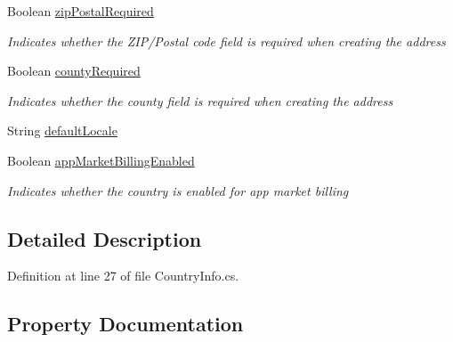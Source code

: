 \begin{DoxyCompactItemize}
Boolean \hyperlink{classcom_1_1clover_1_1sdk_1_1v3_1_1base___1_1_country_info_af540420a76db1fa9ba7858fb62d35f8e}{zip\+Postal\+Required}
\begin{DoxyCompactList}\small\item\em Indicates whether the Z\+I\+P/\+Postal code field is required when creating the address \end{DoxyCompactList}\item 
Boolean \hyperlink{classcom_1_1clover_1_1sdk_1_1v3_1_1base___1_1_country_info_af70d26e669164501f187ddcd7adcc536}{county\+Required}
\begin{DoxyCompactList}\small\item\em Indicates whether the county field is required when creating the address \end{DoxyCompactList}\item 
String \hyperlink{classcom_1_1clover_1_1sdk_1_1v3_1_1base___1_1_country_info_a222d0fe183cf533e46013f23c703295b}{default\+Locale}
\item 
Boolean \hyperlink{classcom_1_1clover_1_1sdk_1_1v3_1_1base___1_1_country_info_ab3e7a8b2306922cf3864db7aade35a94}{app\+Market\+Billing\+Enabled}
\begin{DoxyCompactList}\small\item\em Indicates whether the country is enabled for app market billing \end{DoxyCompactList}\end{DoxyCompactItemize}


\subsection{Detailed Description}


Definition at line 27 of file Country\+Info.\+cs.



\subsection{Property Documentation}
\mbox{\label{classcom_1_1clover_1_1sdk_1_1v3_1_1base___1_1_country_info_ab3e7a8b2306922cf3864db7aade35a94}} 
